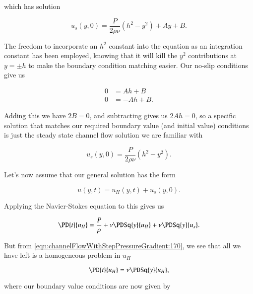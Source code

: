 which has solution

\begin{equation}\label{eqn:channelFlowWithStepPressureGradient:190}
u_s(y, 0) = \frac{P}{2 \rho \nu} \left( h^2 - y^2 \right) + A y + B.
\end{equation}

The freedom to incorporate an $h^2$ constant into the equation as an integration constant has been employed, knowing that it will kill the $y^2$ contributions at $y = \pm h$ to make the boundary condition matching easier.  Our no-slip conditions give us

\begin{align}\label{eqn:channelFlowWithStepPressureGradient:210}
0 &= A h + B \\
0 &= -A h + B.
\end{align}

Adding this we have $2 B = 0$, and subtracting gives us $2 A h = 0$, so a specific solution that matches our required boundary value (and initial value) conditions is just the steady state channel flow solution we are familiar with

\begin{equation}\label{eqn:channelFlowWithStepPressureGradient:230}
u_s(y, 0) = \frac{P}{2 \rho \nu} \left( h^2 - y^2 \right).
\end{equation}

Let's now assume that our general solution has the form

\begin{equation}\label{eqn:channelFlowWithStepPressureGradient:250}
u(y, t) = u_H(y, t) + u_s(y, 0).
\end{equation}

Applying the Navier-Stokes equation to this gives us

\begin{equation}\label{eqn:channelFlowWithStepPressureGradient:270}
\PD{t}{u_H} = \frac{P}{\rho} + \nu \PDSq{y}{u_H} + \nu \PDSq{y}{u_s}.
\end{equation}

But from \ref{eqn:channelFlowWithStepPressureGradient:170}, we see that all we have left is a homogeneous problem in $u_H$

\begin{equation}\label{eqn:channelFlowWithStepPressureGradient:270b}
\PD{t}{u_H} = \nu \PDSq{y}{u_H},
\end{equation}

where our boundary value conditions are now given by

